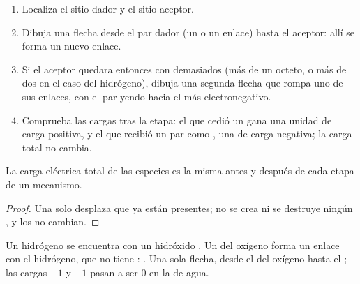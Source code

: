\begin{method}\label{met:g12:curly-arrows:drawing}
\begin{enumerate}
  \item Localiza el sitio dador y el sitio aceptor.
  \item Dibuja una flecha desde el par dador (un  o un enlace)
        hasta el  aceptor: allí se forma un nuevo enlace.
  \item Si el  aceptor quedara entonces con demasiados 
        (más de un octeto, o más de dos en el caso del hidrógeno), dibuja
        una segunda flecha que rompa uno de sus enlaces, con el par
        yendo hacia el  más electronegativo.
  \item Comprueba las cargas tras la etapa: el  que cedió un  gana una unidad de carga positiva, y el que recibió un par
        como , una de carga negativa; la carga total no cambia.
\end{enumerate}
\end{method}

\begin{proposition}\label{prop:g12:curly-arrows:charge}
La carga eléctrica total de las especies es la misma antes y después de
cada etapa de un mecanismo.
\end{proposition}

\begin{proof}
Una  solo desplaza  que ya están presentes; no se
crea ni se destruye ningún , y los  no cambian.
\end{proof}

\begin{example}\label{ex:g12:curly-arrows:first}
Un  hidrógeno  se encuentra con un  hidróxido . Un
 del oxígeno forma un enlace con el  hidrógeno, que no tiene
: . Una sola flecha, desde el  del
oxígeno hasta el ; las cargas $+1$ y $-1$ pasan a ser 0 en la
 de agua.
\end{example}

